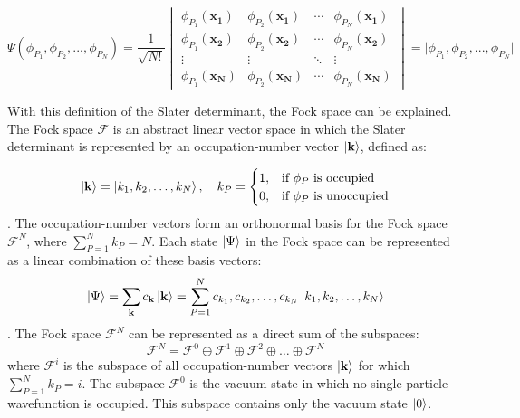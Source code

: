 \begin{equation}
    \Psi(\phi_{P_1}, \phi_{P_2},..., \phi_{P_N}) = \frac{1}{\sqrt{N!}}
    \begin{vmatrix}
        \phi_{P_1}(\mathbf{x_1}) & \phi_{P_2}(\mathbf{x_1}) & \cdots & \phi_{P_N}(\mathbf{x_1}) \\
        \phi_{P_1}(\mathbf{x_2}) & \phi_{P_2}(\mathbf{x_2}) & \cdots & \phi_{P_N}(\mathbf{x_2}) \\
        \vdots & \vdots & \ddots & \vdots \\
        \phi_{P_1}(\mathbf{x_N}) & \phi_{P_2}(\mathbf{x_N}) & \cdots & \phi_{P_N}(\mathbf{x_N})
    \end{vmatrix} = \lvert \phi_{P_1}, \phi_{P_2},..., \phi_{P_N} \rvert 
\end{equation}

With this definition of the Slater determinant, the Fock space can be explained. The Fock space $\mathcal{F}$ is an abstract linear vector space in which the Slater determinant is represented by an occupation-number vector $\ket{\textbf{k}}$, defined as:

\begin{equation}
    \ket{\mathbf{k}} = \ket{k_1, k_2, \ldots, k_N}, \quad k_P = 
    \begin{cases}
        1, & \text{if $\phi_P$ is occupied} \\
        0, & \text{if $\phi_P$ is unoccupied} 
    \end{cases}
\end{equation}
\cite{Helgaker2000}. The occupation-number vectors form an orthonormal basis for the Fock space $\mathcal{F}^N$, where $\sum_{P=1}^{N} k_P = N$. Each state $\ket{\Psi}$ in the Fock space can be represented as a linear combination of these basis vectors:
\begin{equation}
    \ket{\Psi} = \sum_{\mathbf{k}} c_{\mathbf{k}} \ket{\mathbf{k}} = \sum_{P = 1}^N c_{k_1}, c_{k_2},\ldots, c_{k_N} \ket{k_1, k_2, \ldots, k_N}
\end{equation}
\cite{Altland}.
The Fock space $\mathcal{F}^N$ can be represented as a direct sum of the subspaces: 
\begin{equation}
    \mathcal{F}^N = \mathcal{F}^0 \oplus \mathcal{F}^1 \oplus \mathcal{F}^2 \oplus \ldots \oplus \mathcal{F}^N
\end{equation}
where $\mathcal{F}^i$ is the subspace of all occupation-number vectors $\ket{\mathbf{k}}$ for which $\sum_{P=1}^{N} k_P = i$. The subspace $\mathcal{F}^0$ is the vacuum state in which no single-particle wavefunction is occupied. This subspace contains only the vacuum state $\ket{0}$.

